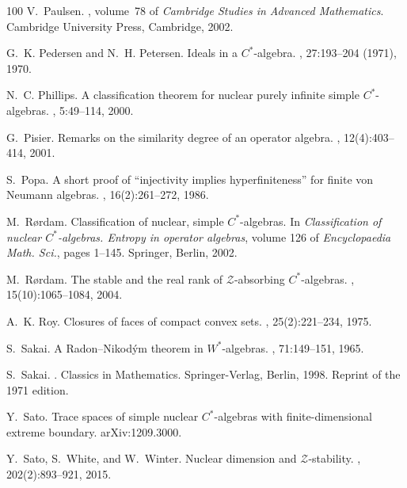 \documentclass[a4paper,11pt]{amsart}
\theoremstyle{definition}
\numberwithin{equation}{section}
\numberwithin{theorem}{section}
\begin{document}
\begin{thebibliography}{100}
V.~Paulsen.
, volume~78 of
  {\em Cambridge Studies in Advanced Mathematics}.
\newblock Cambridge University Press, Cambridge, 2002.

G.~K. Pedersen and N.~H. Petersen.
\newblock Ideals in a {$C^*$}-algebra.
, 27:193--204 (1971), 1970.

N.~C. Phillips.
\newblock A classification theorem for nuclear purely infinite simple
  {$C^*$}-algebras.
, 5:49--114, 2000.

G.~Pisier.
\newblock Remarks on the similarity degree of an operator algebra.
, 12(4):403--414, 2001.

S.~Popa.
\newblock A short proof of ``injectivity implies hyperfiniteness'' for finite
  von {N}eumann algebras.
, 16(2):261--272, 1986.

M.~R{\o}rdam.
\newblock Classification of nuclear, simple {$C^*$}-algebras.
\newblock In {\em Classification of nuclear {$C^*$}-algebras. {E}ntropy in
  operator algebras}, volume 126 of {\em Encyclopaedia Math. Sci.}, pages
  1--145. Springer, Berlin, 2002.

M.~R{\o}rdam.
\newblock The stable and the real rank of {$\mathcal{Z}$}-absorbing
  {$C^*$}-algebras.
, 15(10):1065--1084, 2004.

A.~K. Roy.
\newblock Closures of faces of compact convex sets.
, 25(2):221--234, 1975.

S.~Sakai.
\newblock A {R}adon--{N}ikod\'{y}m theorem in {$W^*$}-algebras.
, 71:149--151, 1965.

S.~Sakai.
.
\newblock Classics in Mathematics. Springer-Verlag, Berlin, 1998.
\newblock Reprint of the 1971 edition.

Y.~Sato.
\newblock Trace spaces of simple nuclear {$C^*$}-algebras with
  finite-dimensional extreme boundary.
\newblock arXiv:1209.3000.

Y.~Sato, S.~White, and W.~Winter.
\newblock Nuclear dimension and {$\mathcal{Z}$}-stability.
, 202(2):893--921, 2015.


\end{thebibliography}
\end{document}
